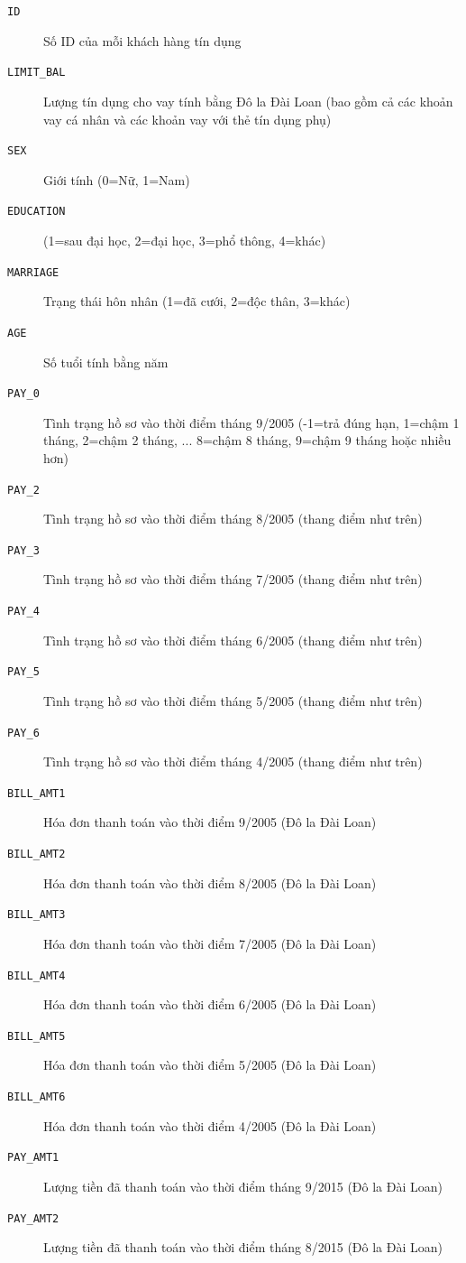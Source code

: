 \documentclass[a4paper]{report}\usepackage[]{graphicx}\usepackage[]{color}
\begin{document}
\begin{description}
  \item [\texttt{ID}] Số ID của mỗi khách hàng tín dụng
  \item [\texttt{LIMIT\_BAL}] Lượng tín dụng cho vay tính bằng Đô la Đài Loan (bao gồm cả các khoản vay cá nhân và các khoản vay với thẻ tín dụng phụ)
  \item [\texttt{SEX}] Giới tính (0=Nữ, 1=Nam)
  \item [\texttt{EDUCATION}] (1=sau đại học, 2=đại học, 3=phổ thông, 4=khác)
  \item [\texttt{MARRIAGE}] Trạng thái hôn nhân (1=đã cưới, 2=độc thân, 3=khác)
  \item [\texttt{AGE}] Số tuổi tính bằng năm
  \item [\texttt{PAY\_0}] Tình trạng hồ sơ vào thời điểm tháng 9/2005 (-1=trả đúng hạn, 1=chậm 1 tháng, 2=chậm 2 tháng, ... 8=chậm 8 tháng, 9=chậm 9 tháng hoặc nhiều hơn)
  \item [\texttt{PAY\_2}] Tình trạng hồ sơ vào thời điểm tháng 8/2005 (thang điểm như trên)
  \item [\texttt{PAY\_3}] Tình trạng hồ sơ vào thời điểm tháng 7/2005 (thang điểm như trên)
  \item [\texttt{PAY\_4}] Tình trạng hồ sơ vào thời điểm tháng 6/2005 (thang điểm như trên)
  \item [\texttt{PAY\_5}] Tình trạng hồ sơ vào thời điểm tháng 5/2005 (thang điểm như trên)
  \item [\texttt{PAY\_6}] Tình trạng hồ sơ vào thời điểm tháng 4/2005 (thang điểm như trên)
  \item [\texttt{BILL\_AMT1}] Hóa đơn thanh toán vào thời điểm 9/2005 (Đô la Đài Loan)
  \item [\texttt{BILL\_AMT2}] Hóa đơn thanh toán vào thời điểm 8/2005 (Đô la Đài Loan)
  \item [\texttt{BILL\_AMT3}] Hóa đơn thanh toán vào thời điểm 7/2005 (Đô la Đài Loan)
  \item [\texttt{BILL\_AMT4}] Hóa đơn thanh toán vào thời điểm 6/2005 (Đô la Đài Loan)
  \item [\texttt{BILL\_AMT5}] Hóa đơn thanh toán vào thời điểm 5/2005 (Đô la Đài Loan)
  \item [\texttt{BILL\_AMT6}] Hóa đơn thanh toán vào thời điểm 4/2005 (Đô la Đài Loan)
  \item [\texttt{PAY\_AMT1}] Lượng tiền đã thanh toán vào thời điểm tháng 9/2015 (Đô la Đài Loan)
  \item [\texttt{PAY\_AMT2}] Lượng tiền đã thanh toán vào thời điểm tháng 8/2015 (Đô la Đài Loan)

\end{description}
\end{document}
